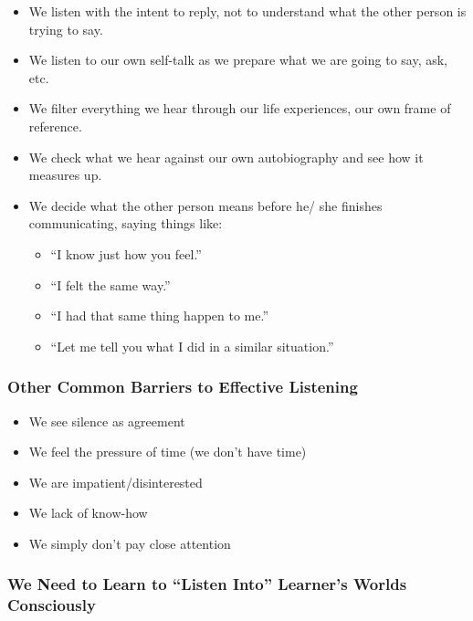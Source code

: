 \documentclass[
]{book}
\providecommand{\tightlist}{%
  \setlength{\itemsep}{0pt}\setlength{\parskip}{0pt}}
\begin{document}
\begin{itemize}
\item
  We listen with the intent to reply, not to understand what the other person is trying to say.
\item
  We listen to our own self-talk as we prepare what we are going to say, ask, etc.
\item
  We filter everything we hear through our life experiences, our own frame of reference.
\item
  We check what we hear against our own autobiography and see how it measures up.
\item
  We decide what the other person means before he/
  she finishes communicating, saying things like:

  \begin{itemize}
  \tightlist
  \item
    ``I know just how you feel.''
  \item
    ``I felt the same way.''
  \item
    ``I had that same thing happen to me.''
  \item
    ``Let me tell you what I did in a similar situation.''
  \end{itemize}
\end{itemize}

\hypertarget{other-common-barriers-to-effective-listening}{%
\subsubsection*{Other Common Barriers to Effective Listening}\label{other-common-barriers-to-effective-listening}}

\begin{itemize}
\tightlist
\item
  We see silence as agreement
\item
  We feel the pressure of time (we don't have time)
\item
  We are impatient/disinterested
\item
  We lack of know-how
\item
  We simply don't pay close attention
\end{itemize}

\hypertarget{we-need-to-learn-to-listen-into-learners-worlds-consciously}{%
\subsubsection*{We Need to Learn to ``Listen Into'' Learner's Worlds Consciously}\label{we-need-to-learn-to-listen-into-learners-worlds-consciously}}
\end{document}
